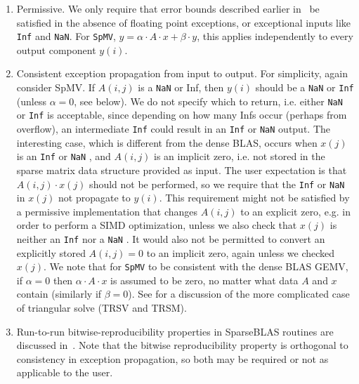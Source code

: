 \documentclass[manuscript,review]{acmart}
\begin{document}
\begin{enumerate}
    \item Permissive. We only require that error bounds described earlier in~ be satisfied in the absence of floating point exceptions, or exceptional inputs like \texttt{Inf} and \texttt{NaN}. For \texttt{SpMV}, $y = \alpha \cdot A \cdot x + \beta \cdot y$, this applies independently to every output component $y(i)$.
    \item Consistent exception propagation from input to output. For simplicity, again consider SpMV. If $A(i,j)$ is a \texttt{NaN}  or Inf, then $y(i)$ should be a \texttt{NaN} or \texttt{Inf}
    (unless $\alpha = 0$, see below). We do not specify which to return, i.e. either \texttt{NaN}  or \texttt{Inf} is acceptable, since depending on how many Infs occur (perhaps from overflow), an intermediate \texttt{Inf} could result in an \texttt{Inf} or \texttt{NaN}  output. The interesting case, which is different from the dense BLAS, occurs when $x(j)$ is an \texttt{Inf} or \texttt{NaN} , and $A(i,j)$ is an implicit zero, i.e. not stored in the sparse matrix data structure provided as input. The user expectation is that $A(i,j) \cdot x(j)$ should not be performed, so we require that the \texttt{Inf} or \texttt{NaN}  in $x(j)$ not propagate to $y(i)$. This requirement might not be satisfied by a permissive implementation that changes $A(i,j)$ to an explicit zero, e.g. in order to perform a SIMD optimization, unless we also check that $x(j)$ is neither an \texttt{Inf} nor a \texttt{NaN} . It would also not be permitted to convert an explicitly stored $A(i,j)=0$ to an implicit zero, again unless we checked $x(j)$. We note that for \texttt{SpMV} to be consistent with the dense BLAS GEMV, if $\alpha = 0$ then $\alpha \cdot A \cdot x$ is assumed to be zero, no matter what data $A$ and $x$ contain (similarly if $\beta=0$).
    See \cite{Proposed_BLAS_LAPACK_exception_handling} for a discussion of the
    more complicated case of triangular solve (TRSV and TRSM).

    \item Run-to-run bitwise-reproducibility properties in SparseBLAS routines are discussed in~. Note that the bitwise reproducibility property is orthogonal to consistency in exception propagation, so both may be required or not as applicable to the user.
\end{enumerate}
\end{document}
